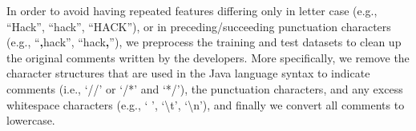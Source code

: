 In order to avoid having repeated features differing only in letter case (e.g., ``Hack'', ``hack'', ``HACK''), or in preceding/succeeding punctuation characters (e.g., ``\textbf{,}hack'', ``hack\textbf{,}''), we preprocess the training and test datasets to clean up the original comments written by the developers. More specifically, we remove the character structures that are used in the Java language syntax to indicate comments (i.e., `//' or `/*' and `*/'), the punctuation characters, and any excess whitespace characters (e.g., ` ', `\textbackslash t', `\textbackslash n'), and finally we convert all comments to lowercase. 